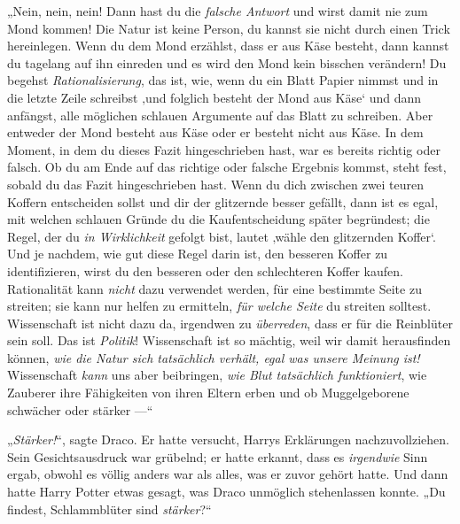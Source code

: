 „Nein, nein, nein! Dann hast du die \emph{falsche Antwort} und wirst damit nie zum Mond kommen! Die Natur ist keine Person, du kannst sie nicht durch einen Trick hereinlegen. Wenn du dem Mond erzählst, dass er aus Käse besteht, dann kannst du tagelang auf ihn einreden und es wird den Mond kein bisschen verändern! Du begehst \emph{Rationalisierung}, das ist, wie, wenn du ein Blatt Papier nimmst und in die letzte Zeile schreibst ‚und folglich besteht der Mond aus Käse‘ und dann anfängst, alle möglichen schlauen Argumente auf das Blatt zu schreiben. Aber entweder der Mond besteht aus Käse oder er besteht nicht aus Käse. In dem Moment, in dem du dieses Fazit hingeschrieben hast, war es bereits richtig oder falsch. Ob du am Ende auf das richtige oder falsche Ergebnis kommst, steht fest, sobald du das Fazit hingeschrieben hast. Wenn du dich zwischen zwei teuren Koffern entscheiden sollst und dir der glitzernde besser gefällt, dann ist es egal, mit welchen schlauen Gründe du die Kaufentscheidung später begründest; die Regel, der du \emph{in Wirklichkeit} gefolgt bist, lautet ‚wähle den glitzernden Koffer‘. Und je nachdem, wie gut diese Regel darin ist, den besseren Koffer zu identifizieren, wirst du den besseren oder den schlechteren Koffer kaufen. Rationalität kann \emph{nicht} dazu verwendet werden, für eine bestimmte Seite zu streiten; sie kann nur helfen zu ermitteln, \emph{für welche Seite} du streiten solltest. Wissenschaft ist nicht dazu da, irgendwen zu \emph{überreden}, dass er für die Reinblüter sein soll. Das ist \emph{Politik}! Wissenschaft ist so mächtig, weil wir damit herausfinden können, \emph{wie die Natur sich tatsächlich verhält, egal was unsere Meinung ist!} Wissenschaft \emph{kann} uns aber beibringen, \emph{wie Blut tatsächlich funktioniert}, wie Zauberer ihre Fähigkeiten von ihren Eltern erben und ob Muggelgeborene schwächer oder stärker —“

„\emph{Stärker!}“, sagte Draco. Er hatte versucht, Harrys Erklärungen nachzuvollziehen. Sein Gesichtsausdruck war grübelnd; er hatte erkannt, dass es \emph{irgendwie} Sinn ergab, obwohl es völlig anders war als alles, was er zuvor gehört hatte. Und dann hatte Harry Potter etwas gesagt, was Draco unmöglich stehenlassen konnte.
„Du findest, Schlammblüter sind \emph{stärker}?“

